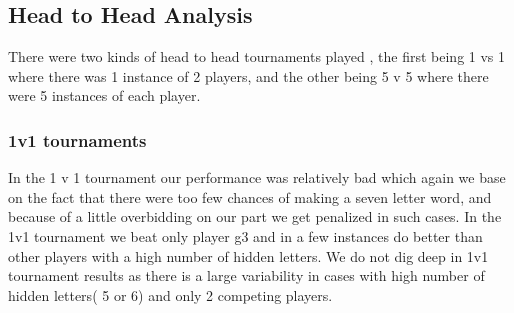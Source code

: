 \documentclass[11pt]{article}
\begin{document}
	\subsection{Head to Head Analysis}
	There were two kinds of head to head tournaments played , the first being 1 vs 1 where there was 1 instance of 2 players, and the other being 5 v 5 where there were 5 instances of each player. 

\subsubsection{1v1 tournaments}	
	In the 1 v 1 tournament our performance was relatively bad which again we base on the fact that there were too few chances of making a seven letter word, and because of a little overbidding on our part we get penalized in such cases. In the 1v1 tournament we beat only player g3 and in a few instances do better than other players with a high number of hidden letters. We do not dig deep in 1v1 tournament results as there is a large variability in cases with high number of hidden letters( 5 or 6) and only 2 competing players. 
\end{document}
